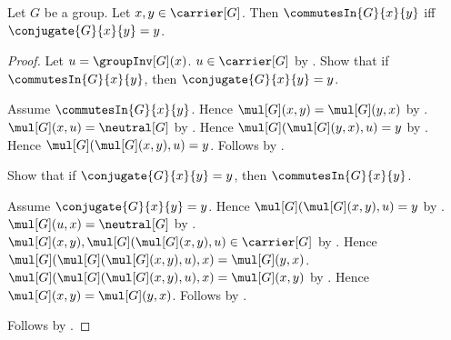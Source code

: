\begin{theorem}\label{commutes_in_iff_conjugate_fixed}
    Let $G$ be a group.
    Let $x,y\in\carrier[G]$.
    Then $\commutesIn{G}{x}{y}$ iff
        $\conjugate{G}{x}{y}=y$.
\end{theorem}
\begin{proof}
    Let $u=\groupInv[G](x)$.
    $u\in\carrier[G]$ by .
    Show that if $\commutesIn{G}{x}{y}$, then
        $\conjugate{G}{x}{y}=y$.
    \begin{subproof}
        Assume $\commutesIn{G}{x}{y}$.
        Hence $\mul[G](x,y)=\mul[G](y,x)$ by
            .
        $\mul[G](x,u)=\neutral[G]$ by
            .
        Hence $\mul[G](\mul[G](y,x),u)=y$ by
            .
        Hence $\mul[G](\mul[G](x,y),u)=y$.
        Follows by .
    \end{subproof}
    Show that if $\conjugate{G}{x}{y}=y$, then
        $\commutesIn{G}{x}{y}$.
    \begin{subproof}
        Assume $\conjugate{G}{x}{y}=y$.
        Hence $\mul[G](\mul[G](x,y),u)=y$ by
            .
        $\mul[G](u,x)=\neutral[G]$ by
            .
        $\mul[G](x,y),\mul[G](\mul[G](x,y),u)\in\carrier[G]$ by
            .
        Hence
            $\mul[G](\mul[G](\mul[G](x,y),u),x)=\mul[G](y,x)$.
        $\mul[G](\mul[G](\mul[G](x,y),u),x)=\mul[G](x,y)$ by
            .
        Hence $\mul[G](x,y)=\mul[G](y,x)$.
        Follows by .
    \end{subproof}
    Follows by \auto.
\end{proof}

